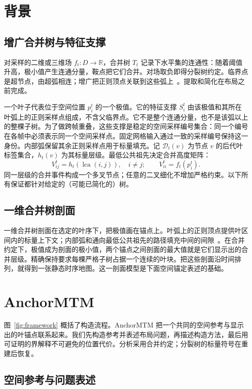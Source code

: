 \documentclass[fontset=none,zihao=5,a4paper]{ctexart}
\newcommand{\lca}{\operatorname{lca}}
\begin{document}
\section{背景}\label{sec:background}
\subsection{增广合并树与特征支撑}
对采样的二维或三维场 $f_t:D\to\mathbb{R}$，合并树 $T_t$ 记录下水平集的连通性：随着阈值升高，极小值产生连通分量，鞍点把它们合并。对场取负即得分裂树约定。临界点是超节点，由超弧相连；增广把正则顶点关联到这些弧上~\cite{Koepp:2023:TMTM,STMTM:2026,Tierny:2018:TTK}。提取和简化在布局之前完成。

一个叶子代表位于空间位置 $p_i^t$ 的一个极值。它的特征支撑 $S_i^t$ 由该极值和其所在叶弧上的正则采样点组成，不含父临界点。它不是整个连通分量，也不是该弧以上的整棵子树。为了做跨帧重叠，这些支撑是稳定的空间采样编号集合：同一个编号在各帧中必须表示同一个空间采样点。固定网格输入通过一致的采样编号保持这一身份。内部弧保留其余正则采样点用于标量填充。记 $\mathcal{D}_t(v)$ 为节点 $v$ 的后代叶标签集合，$h_t(v)$ 为其标量层级。最低公共祖先决定合并高度矩阵：
\begin{equation}\label{eq:merge}
 V_{ij}^t=h_t(\lca(i,j)),\quad i\ne j;\qquad
 V_{ii}^t=f_t(p_i^t).
\end{equation}
同一层级的合并事件构成一个多叉节点；任意的二叉细化不增加严格约束。以下所有保证都针对给定的（可能已简化的）树。

\subsection{一维合并树剖面}
一维合并树剖面在选定的叶序下，把极值画在锚点上。叶弧上的正则顶点提供叶区间内的标量上下文；内部弧和通向最低公共祖先的路径填充中间的间隙~\cite{Koepp:2023:TMTM,STMTM:2026}。在合并约定下，极值成为剖面的极小值，两个锚点之间剖面的最大值就是它们显示出的合并层级。精确保持要求每棵严格子树占据一个连续的叶块。把这些剖面沿时间排列，就得到一张静态时序地图。这一剖面模型是下面空间锚定表述的基础。

\section{AnchorMTM}\label{sec:method}
图~\ref{fig:framework} 概括了构造流程。AnchorMTM 把一个共同的空间参考与显示出的叶锚点联系起来。我们先构造参考并表述布局问题，再描述构造方法，最后用可证明的界解释不可避免的位置代价。分析采用合并约定；分裂树的标量符号在重建后恢复。

\subsection{空间参考与问题表述}\label{sec:reference}
\end{document}
